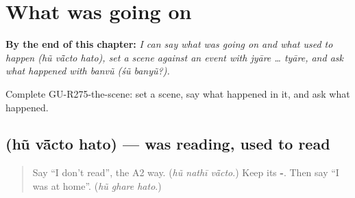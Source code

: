 
\chapter{What was going on}
\label{ch:gu-what-was-going-on}

\begin{chapteropening}
\textbf{By the end of this chapter:} \emph{I can say what was going on and what used to happen (hũ vā̃cto hato), set a scene against an event with jyāre … tyāre, and ask what happened with banvũ (śũ banyũ?).}

Complete GU-R275-the-scene: set a scene, say what happened in it, and ask what happened.
\end{chapteropening}

\section[\texorpdfstring{\gu{હું} \gu{વાંચતો} \gu{હતો} (hũ vā̃cto hato)}{હું વાંચતો હતો (hũ vā̃cto hato)}]{   (hũ vā̃cto hato) — was reading, used to read}

\label{lesson:GU-C275-vanchto-hato}



\begin{quote}
Say \textquotedblleft{}I don't read\textquotedblright{}, the A2 way. (\emph{hũ nathī vā̃cto}.) Keep its \textbf{-}. Then say \textquotedblleft{}I was at home\textquotedblright{}. (\emph{hũ ghare hato}.)
\end{quote}


